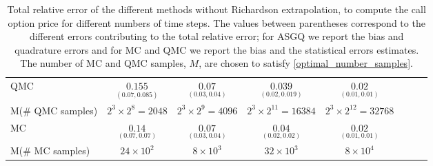 \begin{table}[h!]
\begin{small}
\begin{tabular}{l*{6}{c}r}
			\hline
			QMC     & $\underset{(0.07,0.085)}{\mathbf{0.155}}$  & $\underset{(0.03,0.04)}{\mathbf{0.07}}$  & $\underset{(0.02,0.019)}{\mathbf{0.039}}$ & $\underset{(0.01,0.01)}{\mathbf{0.02}}$  \\		
			M(\# QMC samples)   & $2^3 \times 2^8=2048$  &  $2^3 \times 2^9=4096$  &  $2^3 \times 2^{11}=16384$ &  $2^3 \times 2^{12}=32768$ \\
%			
			\hline
			MC    & $\underset{(0.07,0.07)}{\mathbf{0.14}}$  & $\underset{(0.03,0.04)}{\mathbf{0.07}}$  & $\underset{(0.02,0.02)}{\mathbf{0.04}}$ & $\underset{(0.01,0.01)}{\mathbf{0.02}}$  \\		
			M(\# MC samples)   & $24 \times 10^2$  & $8 \times 10^3$  & $32 \times 10^3$ & $8 \times 10^4$  \\		
			\bottomrule[1.25pt]
		\end{tabular}
		\caption{Total relative error of the different methods without Richardson extrapolation, to compute the call option price  for different numbers of time steps. The values between parentheses correspond to the different errors contributing to the total relative error; for ASGQ we report the bias and quadrature errors and for MC and QMC we report the bias and the statistical errors estimates. The number of MC and QMC samples, $M$, are chosen to satisfy \eqref{optimal_number_samples}.}
		\label{Total error of MISC and MC to compute Call option price of the different tolerances for different number of time steps. Case set 5, without Richardson extrapolation. The numbers between parentheses are the corresponding absolute errors.}
	\end{small}
\end{table}

